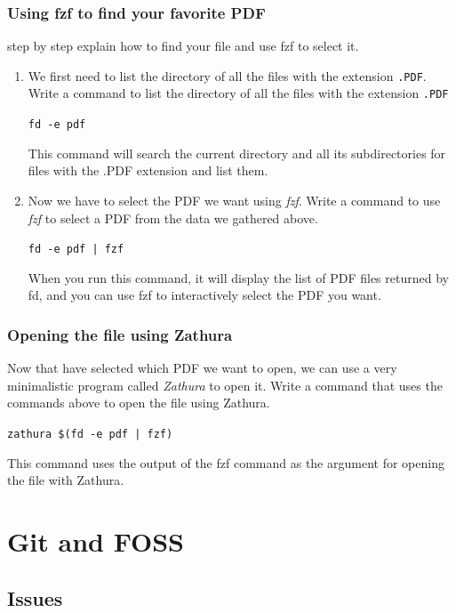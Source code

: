 \documentclass[titlepage]{article}
\begin{document}
	\subsubsection{Using fzf to find your favorite PDF}
	step by step explain how to find your file and use fzf to select it.
	
	\begin{enumerate}
		\item We first need to list the directory of all the files with the extension \texttt{.PDF}. Write a command to list the directory of all the files with the extension \texttt{.PDF}
		
		\texttt{fd -e pdf}
		
		This command will search the current directory and all its subdirectories for files with the .PDF extension and list them.
	
		\item Now we have to select the PDF we want using \textit{fzf}. Write a command to use \textit{fzf} to select a PDF from the data we gathered above.
		
		\texttt{fd -e pdf | fzf}
		
		When you run this command, it will display the list of PDF files returned by fd, and you can use fzf to interactively select the PDF you want.
		
	\end{enumerate}

	\subsubsection{Opening the file using Zathura}
	Now that have selected which PDF we want to open, we can use a very minimalistic program called \textit{Zathura} to open it. Write a command that uses the commands above to open the file using Zathura.
	
	\texttt{zathura \$(fd -e pdf | fzf)}
	
	This command uses the output of the fzf command as the argument for opening the file with Zathura.
	
	\newpage
	
	\section{Git and FOSS}
	\subsection{Issues}
	
\end{document}
